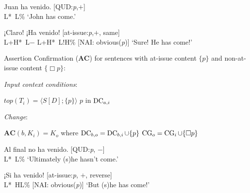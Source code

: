 \begin{exe} 
\ex \label{ex:havenidoOBVconf}
	\begin{xlist}
		\ex
		\begin{xlist}[A:]  
		 Juan ha venido. \hfill [QUD:\textit{p},$+$] \\
		\hspace*{5em} L*~L\%
		\glt `John has come.'
		\end{xlist}
		\ex 
		\begin{xlist}[A:]
		 ¡Claro! ¡Ha venido! \hfill [at-issue:\textit{p},$+$, same] \\
		\hspace*{.1em} L+H*~L$-$ \hspace*{.3em} L+H*~L!H\% \hfill [\ac{NAI}: obvious(\textit{p})] 
		\glt `Sure! He has come!'
		\end{xlist}
	\end{xlist}

\ex\label{ex:assertionconfirmationOBV} Assertion Confirmation (\textbf{AC}) for sentences with at-issue content $\{ p \}$ and non-at-issue content $\{ \Box p \}$:
	\begin{xlist}
		\ex \textit{Input context conditions}: 
		\begin{xlist}
			\ex $\textit{top}(T_i)=\langle S [D];\{ p \}\rangle$
			\ex $p$ in $\operatorname{DC}_{a,i}$ 
		\end{xlist}
		
		\ex \textit{Change}: 
		\begin{xlist}
			\ex $\textbf{AC}(b,K_i)=K_o$ where $\operatorname{DC}_{b,o}=\operatorname{DC}_{b,i}\cup \{ p \}$
			\ex $\operatorname{CG}_{o} = \operatorname{CG}_{i} \cup \{ \Box p \}$
		\end{xlist}
	\end{xlist}

\ex \label{ex:havenidoOBVdenial} 
	\begin{xlist}
		\ex 
		\begin{xlist}[A:]
		 Al final no ha venido. \hfill [QUD:\textit{p}, $-$] \\
		\hspace*{6.5em} L*~L\% 
		\glt `Ultimately (s)he hasn't come.'
		\end{xlist}
		
		\ex 
		\begin{xlist}[A:]
		 ¡Si ha venido! \hfill [at-issue:\textit{p}, $+$, reverse] \\
		\hspace*{3.5em} L*~HL\% \hfill [\ac{NAI}: obvious(\textit{p})]
		\glt `But (s)he has come!'
		\end{xlist}
	\end{xlist}


\end{exe}
